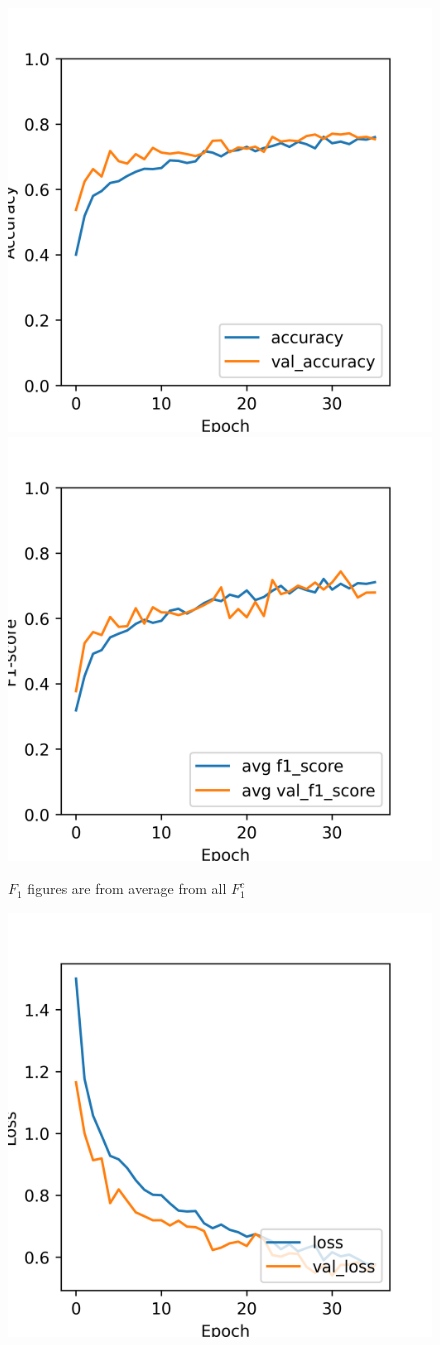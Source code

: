 \begin{figure}[H]
	\centering
	\includegraphics[width=.5\textwidth]{assets/results/preMELD.vgg/vgg16_feature_extract/learning_history-acc.png}\hfill
	\includegraphics[width=.5\textwidth]{assets/results/preMELD.vgg/vgg16_feature_extract/learning_history-f1_score.png}\hfill
	\caption{$F_1$ figures are from average from all $F_1^c$}
	\label{fig:figure10}
\end{figure}

\begin{figure}[H]
	\centering
	\includegraphics[width=.5\textwidth]{assets/results/preMELD.vgg/vgg16_feature_extract/learning_history-loss.png}
	
	\label{fig:figure13}
\end{figure}

